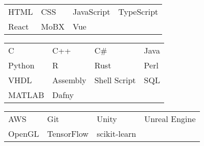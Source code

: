 \documentclass[paper=a4,fontsize=10pt]{resume}
\begin{document}
{	
		\begin{tabular}{llll}
			HTML & CSS & JavaScript & TypeScript \\
			React & MoBX & Vue
		\end{tabular}

		\medskip\normalsize

		\begin{tabular}{llll}
			C & C++ & C\# & Java \\
			Python & R & Rust & Perl \\
			VHDL & Assembly & Shell Script & SQL \\
			MATLAB & Dafny
		\end{tabular}

		\medskip\normalsize

		\begin{tabular}{llll}
			AWS & Git & Unity & Unreal Engine \\
			OpenGL & TensorFlow & scikit-learn
		\end{tabular}
}
\end{document}
